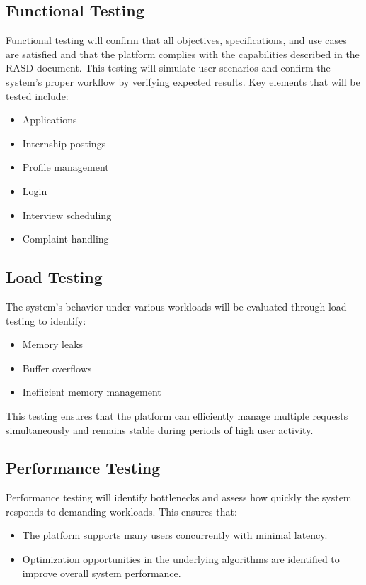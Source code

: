 \subsection{Functional Testing}
Functional testing will confirm that all objectives, specifications, and use cases are satisfied and that the platform complies with the capabilities described in the RASD document. This testing will simulate user scenarios and confirm the system's proper workflow by verifying expected results. Key elements that will be tested include:
\begin{itemize}
    \item Applications
    \item Internship postings
    \item Profile management
    \item Login
    \item Interview scheduling
    \item Complaint handling
\end{itemize}

\subsection{Load Testing}
The system's behavior under various workloads will be evaluated through load testing to identify:
\begin{itemize}
    \item Memory leaks
    \item Buffer overflows
    \item Inefficient memory management
\end{itemize}
This testing ensures that the platform can efficiently manage multiple requests simultaneously and remains stable during periods of high user activity.

\subsection{Performance Testing}
Performance testing will identify bottlenecks and assess how quickly the system responds to demanding workloads. This ensures that:
\begin{itemize}
    \item The platform supports many users concurrently with minimal latency.
    \item Optimization opportunities in the underlying algorithms are identified to improve overall system performance.
\end{itemize}


